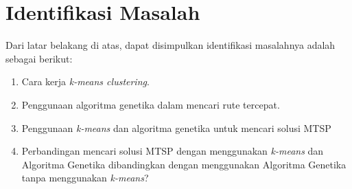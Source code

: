 \section{Identifikasi Masalah}

Dari latar belakang di atas, dapat disimpulkan identifikasi masalahnya adalah sebagai berikut:
\begin{enumerate}
	\item Cara kerja \textit{k-means clustering}.
	\item Penggunaan algoritma genetika dalam mencari rute tercepat.
	\item Penggunaan \textit{k-means} dan algoritma genetika untuk mencari solusi MTSP
	\item Perbandingan mencari solusi MTSP dengan menggunakan \textit{k-means} dan Algoritma Genetika dibandingkan dengan menggunakan Algoritma Genetika tanpa menggunakan \textit{k-means}?
\end{enumerate}